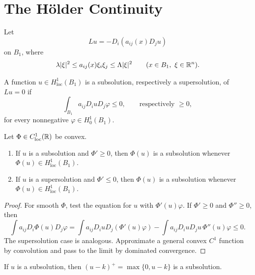 \section{The H\"older Continuity}

Let
\[
Lu=-D_i(a_{ij}(x)D_j u)
\]
on $B_1$, where
\[
\lambda|\xi|^2\leq a_{ij}(x)\xi_i\xi_j\leq\Lambda|\xi|^2
\qquad(x\in B_1,\ \xi\in\mathbb{R}^n).
\]

\begin{definition}\label{hanlin:weaksol-part2-homogeneous-subsolution}
A function $u\in H^1_{\mathrm{loc}}(B_1)$ is a subsolution, respectively a
supersolution, of $Lu=0$ if
\[
\int_{B_1}a_{ij}D_i uD_j\varphi\leq0,
\qquad\text{respectively }\geq0,
\]
for every nonnegative $\varphi\in H^1_0(B_1)$.
\end{definition}

\begin{lemma}\label{hanlin:weaksol-part2-convex-composition}
Let $\Phi\in C^1_{\mathrm{loc}}(\mathbb{R})$ be convex.
\begin{enumerate}
\item[(i)] If $u$ is a subsolution and $\Phi'\geq0$, then
$\Phi(u)$ is a subsolution whenever $\Phi(u)\in H^1_{\mathrm{loc}}(B_1)$.
\item[(ii)] If $u$ is a supersolution and $\Phi'\leq0$, then
$\Phi(u)$ is a subsolution whenever $\Phi(u)\in H^1_{\mathrm{loc}}(B_1)$.
\end{enumerate}
\end{lemma}
\begin{proof}
\sketch For smooth $\Phi$, test the equation for $u$ with
$\Phi'(u)\varphi$. If $\Phi'\geq0$ and $\Phi''\geq0$, then
\[
\int a_{ij}D_i\Phi(u)D_j\varphi
=\int a_{ij}D_i uD_j(\Phi'(u)\varphi)
-\int a_{ij}D_i uD_j u\,\Phi''(u)\varphi\leq0.
\]
The supersolution case is analogous. Approximate a general convex $C^1$
function by convolution and pass to the limit by dominated convergence.
\end{proof}

\begin{remark}\label{hanlin:weaksol-part2-positive-part-subsolution}
If $u$ is a subsolution, then $(u-k)^+=\max\{0,u-k\}$ is a subsolution.
\end{remark}

